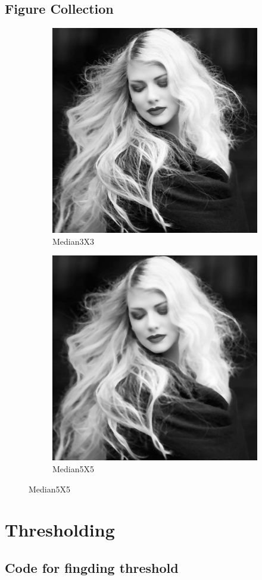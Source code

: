 \documentclass[14pt]{article}
\begin{document}
	\subsection{Figure Collection }
	\newpage
	\begin{figure}[hbt!]
		\centering
	\begin{subfigure}[b]{0.4\linewidth}
		\includegraphics[width=\linewidth]{m3.png}
		\caption{Median3X3}
	\end{subfigure}
	\begin{subfigure}[b]{0.4\linewidth}
		\includegraphics[width=\linewidth]{m5.png}
		\caption{Median5X5}
	\end{subfigure}
	\end{figure}
\section{Thresholding}
\subsection{Code for fingding threshold}

\end{document}
